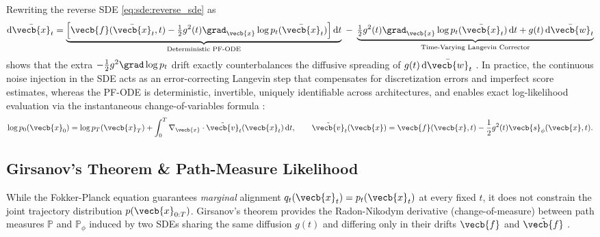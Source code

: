 \documentclass[../../../../master.tex]{subfiles}
\begin{document}
\begin{intuition}
Rewriting the reverse SDE \eqref{eq:sde:reverse_sde} as
\[
  \mathrm{d}\bar{\vecb{x}}_t = \underbrace{\left[\vecb{f}(\bar{\vecb{x}}_t, t) - \tfrac{1}{2}g^2(t)\grad_{\vecb{x}}\log p_t(\bar{\vecb{x}}_t)\right]\mathrm{d}t}_{\text{Deterministic PF-ODE}} \;-\; \underbrace{\tfrac{1}{2}g^2(t)\grad_{\vecb{x}}\log p_t(\bar{\vecb{x}}_t)\,\mathrm{d}t + g(t)\,\mathrm{d}\bar{\vecb{w}}_t}_{\text{Time-Varying Langevin Corrector}}
\]
shows that the extra $-\frac{1}{2}g^2 \grad \log p_t$ drift exactly counterbalances the diffusive spreading of $g(t)\,\mathrm{d}\bar{\vecb{w}}_t$  . In practice, the continuous noise injection in the SDE acts as an error-correcting Langevin step that compensates for discretization errors and imperfect score estimates, whereas the PF-ODE is deterministic, invertible, uniquely identifiable across architectures, and enables exact log-likelihood evaluation via the instantaneous change-of-variables formula :
\begin{equation}\label{eq:sde:exact_nll}
  \log p_0(\vecb{x}_0) = \log p_T(\vecb{x}_T) + \int_0^T \nabla_{\vecb{x}} \cdot \tilde{\vecb{v}}_t(\vecb{x}_t)\,\mathrm{d}t, \qquad \tilde{\vecb{v}}_t(\vecb{x}) = \vecb{f}(\vecb{x}, t) - \frac{1}{2}g^2(t)\vecb{s}_\phi(\vecb{x}, t).
\end{equation}
\end{intuition}

\subsection{Girsanov's Theorem \& Path-Measure Likelihood}\label{sec:sde:girsanov}

While the Fokker-Planck equation guarantees \emph{marginal} alignment $q_t(\vecb{x}_t) = p_t(\vecb{x}_t)$ at every fixed $t$, it does not constrain the joint trajectory distribution $p(\vecb{x}_{0:T})$. Girsanov's theorem provides the Radon-Nikodym derivative (change-of-measure) between path measures $\mathbb{P}$ and $\mathbb{P}_\phi$ induced by two SDEs sharing the same diffusion $g(t)$ and differing only in their drifts $\vecb{f}$ and $\tilde{\vecb{f}}$ .
\end{document}
